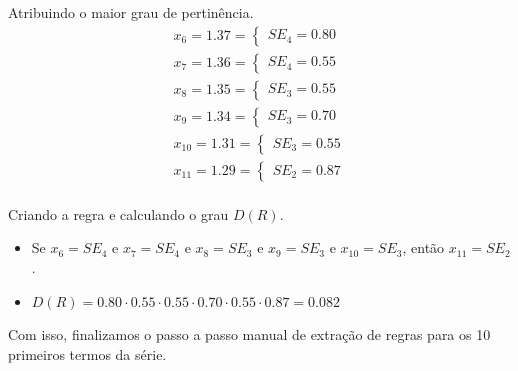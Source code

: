 \documentclass[12pt]{article}
\begin{document}
Atribuindo o maior grau de pertinência.
\begin{align*}
	x_6=1.37=\begin{cases}
		SE_4=0.80
	\end{cases}\\
	x_7=1.36=\begin{cases}
		SE_4=0.55
	\end{cases}\\
	x_8=1.35=\begin{cases}
		SE_3=0.55
	\end{cases}\\
	x_9=1.34=\begin{cases}
		SE_3=0.70
	\end{cases}\\
	x_{10}=1.31=\begin{cases}
		SE_3=0.55
	\end{cases}\\
	x_{11}=1.29=\begin{cases}
		SE_2=0.87
	\end{cases}\\
\end{align*}

Criando a regra e calculando o grau $D(R)$.
\begin{itemize}
	\item Se $x_6=SE_4$ e $x_7=SE_4$ e $x_8=SE_3$ e $x_9=SE_3$ e $x_{10}=SE_3$, então $x_{11}=SE_2$.
	\item $D(R)=0.80\cdot0.55\cdot0.55\cdot0.70\cdot0.55\cdot0.87=0.082$
\end{itemize}


 Com isso, finalizamos o passo a passo manual de extração de regras para os 10 primeiros termos da série.
\end{document}
